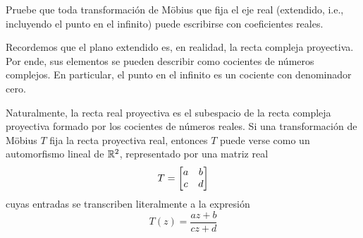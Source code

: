 \begin{exercise}
Pruebe que toda transformación de Möbius que fija el eje real (extendido, i.e., incluyendo el punto en el infinito) puede escribirse con coeficientes reales.
\end{exercise}

\begin{solution}
Recordemos que el plano extendido es, en realidad, la recta compleja proyectiva. Por ende, sus elementos se pueden describir como cocientes de números complejos. En particular, el punto en el infinito es un cociente con denominador cero.

Naturalmente, la recta real proyectiva es el subespacio de la recta compleja proyectiva formado por los cocientes de números reales. Si una transformación de Möbius $T$ fija la recta proyectiva real, entonces $T$ puede verse como un automorfismo lineal de $\mathbb R^2$, representado por una matriz real
$$T = \begin{bmatrix} a & b \\ c & d \end{bmatrix}$$
cuyas entradas se transcriben literalmente a la expresión
$$T(z) = \frac {az + b} {cz + d}$$
\end{solution}

\newpage
